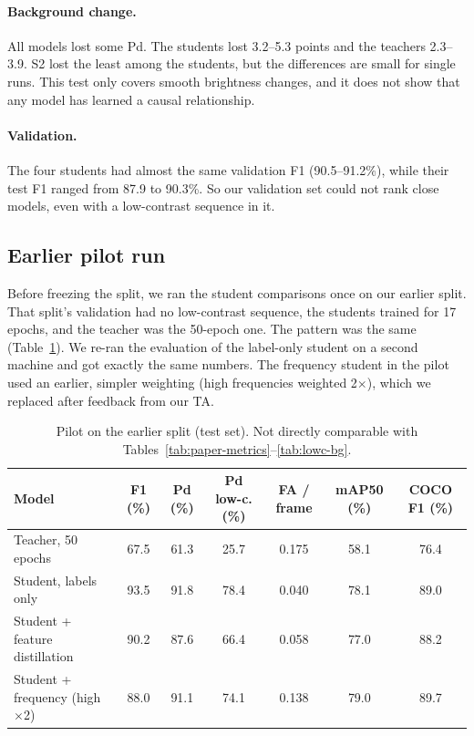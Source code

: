 \documentclass[11pt,a4paper]{article}
\begin{document}
\paragraph{Background change.} All models lost some Pd. The students lost 3.2--5.3 points and the teachers
2.3--3.9. S2 lost the least among the students, but the differences are small for single runs. This test only
covers smooth brightness changes, and it does not show that any model has learned a causal relationship.

\paragraph{Validation.} The four students had almost the same validation F1 (90.5--91.2\%), while their test F1
ranged from 87.9 to 90.3\%. So our validation set could not rank close models, even with a low-contrast sequence
in it.

\subsection{Earlier pilot run}

Before freezing the split, we ran the student comparisons once on our earlier split. That split's validation had
no low-contrast sequence, the students trained for 17 epochs, and the teacher was the 50-epoch one. The pattern
was the same (Table~\ref{tab:pilot}). We re-ran the evaluation of the label-only student on a second machine and
got exactly the same numbers. The frequency student in the pilot used an earlier, simpler weighting (high
frequencies weighted 2$\times$), which we replaced after feedback from our TA.

\begin{table}[htbp]
\centering
\caption{Pilot on the earlier split (test set). Not directly comparable with Tables~\ref{tab:paper-metrics}--\ref{tab:lowc-bg}.}
\label{tab:pilot}
\small
\begin{tabular}{lcccccc}
\toprule
Model & F1 (\%) & Pd (\%) & Pd low-c. (\%) & FA / frame & mAP50 (\%) & COCO F1 (\%) \\
\midrule
Teacher, 50 epochs & 67.5 & 61.3 & 25.7 & 0.175 & 58.1 & 76.4 \\
Student, labels only & 93.5 & 91.8 & 78.4 & 0.040 & 78.1 & 89.0 \\
Student + feature distillation & 90.2 & 87.6 & 66.4 & 0.058 & 77.0 & 88.2 \\
Student + frequency (high $\times$2) & 88.0 & 91.1 & 74.1 & 0.138 & 79.0 & 89.7 \\
\bottomrule
\end{tabular}
\end{table}
\end{document}
